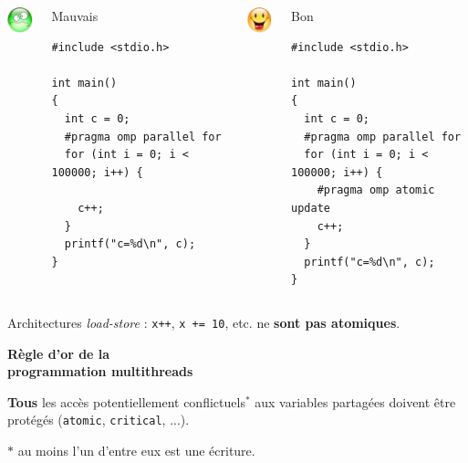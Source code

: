 \documentclass[xcolor={x11names,svgnames}]{beamer}
\begin{document}

\begin{frame}[fragile]

  \begin{columns}[t]
  \column{5.5cm}
  \centering\includegraphics[width=1cm]{triste.png}

  \begin{block}{Mauvais}
\begin{verbatim}
#include <stdio.h>
  
int main()
{
  int c = 0;
  #pragma omp parallel for
  for (int i = 0; i < 100000; i++) { 

    c++; 
  }
  printf("c=%d\n", c);
}
\end{verbatim}
\end{block}
    
    
    \column{5.5cm}
    \centering\includegraphics[width=1cm]{content.png}

  \begin{block}{Bon}
\begin{verbatim}
#include <stdio.h>
  
int main()
{
  int c = 0;
  #pragma omp parallel for
  for (int i = 0; i < 100000; i++) { 
    #pragma omp atomic update
    c++; 
  }
  printf("c=%d\n", c);
}
\end{verbatim}
\end{block}
  \end{columns}

  \begin{alertblock}{Architectures \emph{load-store} :}
    \texttt{x++}, \texttt{x += 10}, etc. ne \textbf{sont pas atomiques}.
  \end{alertblock}

\end{frame}


\begin{frame}[label=golden_rule]

  \begin{center}
    \Huge \bf \alert{Règle d'or de la \\ programmation multithreads}
  \end{center}

  \bigskip
  
  {\Large \textbf{Tous} les accès potentiellement conflictuels${}^*$ aux variables partagées doivent être protégés (\texttt{atomic}, \texttt{critical}, ...).}

  \bigskip

  $*$ au moins l'un d'entre eux est une écriture.  
\end{frame}
\end{document}
